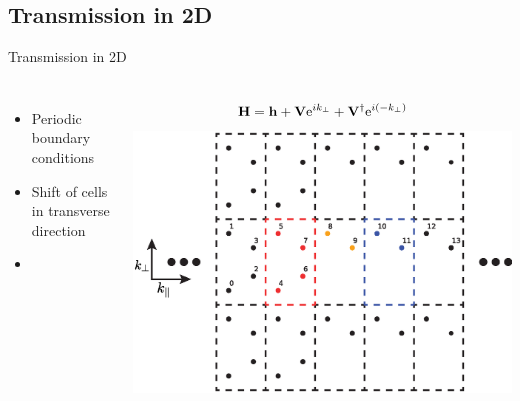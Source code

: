 \documentclass[hyperref={colorlinks=true,urlcolor=blue,linkcolor=.},aspectratio=1610,mathserif]{beamer}
\newcommand{\me}{\mathrm{e}}
\newcommand{\im}[3]{\inputminted[linenos=true, python3=true, firstline=#2, lastline=#3]{python}{#1}}
\begin{document}
\subsection{Transmission in 2D}

\begin{frame}{Transmission in 2D}
	\centering
	\begin{columns}[c]
		\begin{itemize}
		    \item Periodic boundary conditions
		    \item Shift of cells in transverse direction
		    \item 
		\end{itemize}
		\begin{align*}
			\vb{H} = \vb{h} + \vb{V}\me^{ik_{\perp}} + \vb{V}^{\dagger} \me^{i\pqty{-k_{\perp}}}
		\end{align*}
		\includegraphics[width=.7\textwidth]{Figures/2DTrans.eps}
	\end{columns}
	\begin{columns}[c]
		\im{Listings/Functions.py}{250}{253}
	\end{columns}

\end{frame}
\end{document}
